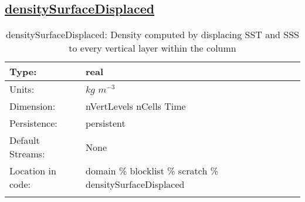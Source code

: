 \subsection[densitySurfaceDisplaced]{\hyperref[sec:var_tab_scratch]{densitySurfaceDisplaced}}
\label{subsec:var_sec_scratch_densitySurfaceDisplaced}
\begin{center}
\begin{longtable}{| p{2.0in} | p{4.0in} |}
        \hline 
        Type: & real \\
        \hline 
        Units: & $kg$ $m^{-3}$ \\
        \hline 
        Dimension: & nVertLevels nCells Time \\
        \hline 
        Persistence: & persistent \\
        \hline 
		 Default Streams: & None \\
        \hline 
		 Location in code: & domain \% blocklist \% scratch \% densitySurfaceDisplaced \\
		 \hline 
    \caption{densitySurfaceDisplaced: Density computed by displacing SST and SSS to every vertical layer within the column}
\end{longtable}
\end{center}
